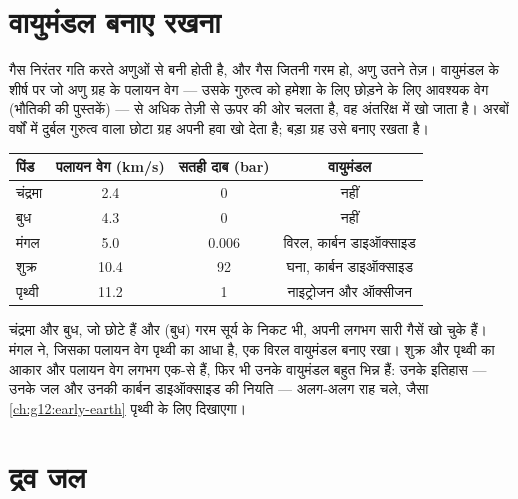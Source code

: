 \section{वायुमंडल बनाए रखना}

गैस निरंतर गति करते अणुओं से बनी होती है, और गैस जितनी गरम हो, अणु उतने तेज़।
वायुमंडल के शीर्ष पर जो अणु ग्रह के पलायन वेग --- उसके गुरुत्व को हमेशा के लिए छोड़ने के
लिए आवश्यक वेग (भौतिकी की पुस्तकें) --- से अधिक तेज़ी से ऊपर की ओर चलता है, वह
अंतरिक्ष में खो जाता है। अरबों वर्षों में दुर्बल गुरुत्व वाला छोटा ग्रह अपनी हवा खो देता है;
बड़ा ग्रह उसे बनाए रखता है।

\begin{center}
\small
\begin{tabular}{lccc}
\hline
पिंड & पलायन वेग (\unit{km/s}) & सतही दाब (bar) & वायुमंडल \\
\hline
चंद्रमा & 2.4 & 0 & नहीं \\
बुध & 4.3 & 0 & नहीं \\
मंगल & 5.0 & 0.006 & विरल, कार्बन डाइऑक्साइड \\
शुक्र & 10.4 & 92 & घना, कार्बन डाइऑक्साइड \\
पृथ्वी & 11.2 & 1 & नाइट्रोजन और ऑक्सीजन \\
\hline
\end{tabular}
\end{center}

\begin{remark}[आकार ही पूरी कहानी नहीं]\label{rem:g10:habitable-planet:size}
चंद्रमा और बुध, जो छोटे हैं और (बुध) गरम सूर्य के निकट भी, अपनी लगभग सारी गैसें खो
चुके हैं। मंगल ने, जिसका पलायन वेग पृथ्वी का आधा है, एक विरल वायुमंडल बनाए रखा। शुक्र और
पृथ्वी का आकार और पलायन वेग लगभग एक-से हैं, फिर भी उनके वायुमंडल बहुत भिन्न हैं: उनके
इतिहास --- उनके जल और उनकी कार्बन डाइऑक्साइड की नियति --- अलग-अलग राह चले, जैसा
\cref{ch:g12:early-earth} पृथ्वी के लिए दिखाएगा।
\end{remark}

\section{द्रव जल}

